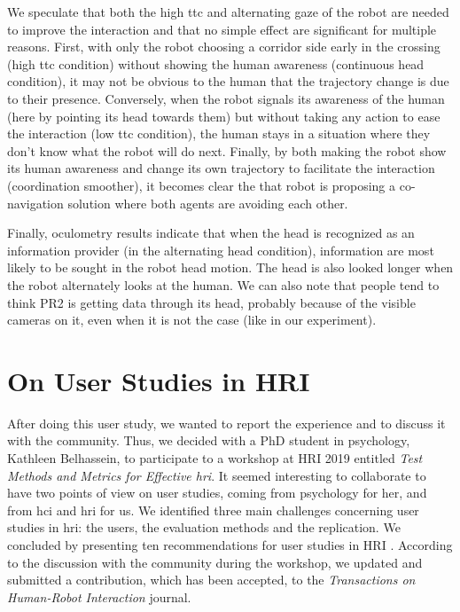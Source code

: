 \documentclass[a4paper,11pt,twoside]{StyleThese}
\begin{document}
We speculate that both the high \acrshort{ttc} and alternating gaze of the robot are needed to improve the interaction and that no simple effect are significant for multiple reasons. First, with only the robot choosing a corridor side early in the crossing (high \acrshort{ttc} condition) without showing the human awareness (continuous head condition), it may not be obvious to the human that the trajectory change is due to their presence. Conversely, when the robot signals its awareness of the human (here by pointing its head towards them) but without taking any action to ease the interaction (low \acrshort{ttc} condition), the human stays in a situation where they don't know what the robot will do next. Finally, by both making the robot show its human awareness and change its own trajectory to facilitate the interaction (coordination smoother), it becomes clear the that robot is proposing a co-navigation solution where both agents are avoiding each other.

Finally, oculometry results indicate that when the head is recognized as an information provider (in the alternating head condition), information are most likely to be sought in the robot head motion. The head is also looked longer when the robot alternately looks at the human. We can also note that people tend to think PR2 is getting data through its head, probably because of the visible cameras on it, even when it is not the case (like in our experiment).


\section{On User Studies in HRI}
After doing this user study, we wanted to report the experience and to discuss it with the community. Thus, we decided with a PhD student in psychology, Kathleen Belhassein, to participate to a workshop at HRI 2019 entitled \textit{Test Methods and Metrics for Effective \acrshort{hri}}. It seemed interesting to collaborate to have two points of view on user studies, coming from psychology for her, and from \acrshort{hci} and \acrshort{hri} for us. We identified three main challenges concerning user studies in \acrshort{hri}: the users, the evaluation methods and the replication. We concluded by presenting ten recommendations for user studies in HRI \cite{belhassein2019towards}. According to the discussion with the community during the workshop, we updated and submitted a contribution, which has been accepted, to the \textit{Transactions on Human-Robot Interaction} journal.
\end{document}
